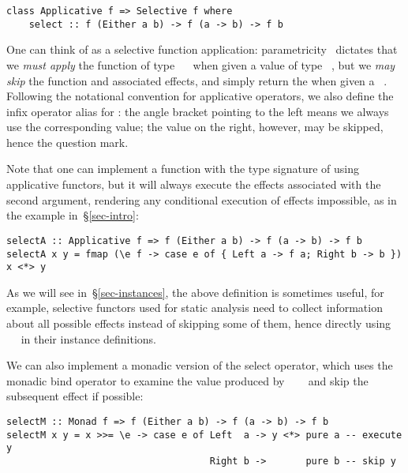 \vspace{1mm}
\begin{verbatim}
class Applicative f => Selective f where
    select :: f (Either a b) -> f (a -> b) -> f b
\end{verbatim}
\vspace{1mm}

\noindent
One can think of  as a selective function application:
parametricity~\citep{wadler1989theorems} dictates that we \emph{must apply} the
function of type ~\hs{->}~ when given a value of type
~, but we \emph{may skip} the function and associated effects,
and simply return the  when given a ~. Following the
notational convention for applicative operators, we also define the infix
operator alias  for : the angle bracket pointing to the left
means we always use the corresponding value; the value on the right, however,
may be skipped, hence the question mark.

Note that one can implement a function with the type signature of 
using applicative functors, but it will always execute the effects associated
with the second argument, rendering any conditional execution of effects
impossible, as in the  example in~\S\ref{sec-intro}:

\vspace{1mm}
\begin{verbatim}
selectA :: Applicative f => f (Either a b) -> f (a -> b) -> f b
selectA x y = fmap (\e f -> case e of { Left a -> f a; Right b -> b }) x <*> y
\end{verbatim}
\vspace{1mm}

\noindent
As we will see in~\S\ref{sec-instances}, the above definition is sometimes
useful, for example, selective functors used for static analysis need to collect
information about all possible effects instead of skipping some of them,
hence directly using ~\hs{=}~ in their 
instance definitions.

We can also implement a monadic version of the select operator, which uses the
monadic bind operator to examine the value produced by
~~~ and skip the subsequent effect if possible:

\vspace{1mm}
\begin{verbatim}
selectM :: Monad f => f (Either a b) -> f (a -> b) -> f b
selectM x y = x >>= \e -> case e of Left  a -> y <*> pure a -- execute y
                                    Right b ->       pure b -- skip y
\end{verbatim}
\vspace{1mm}

